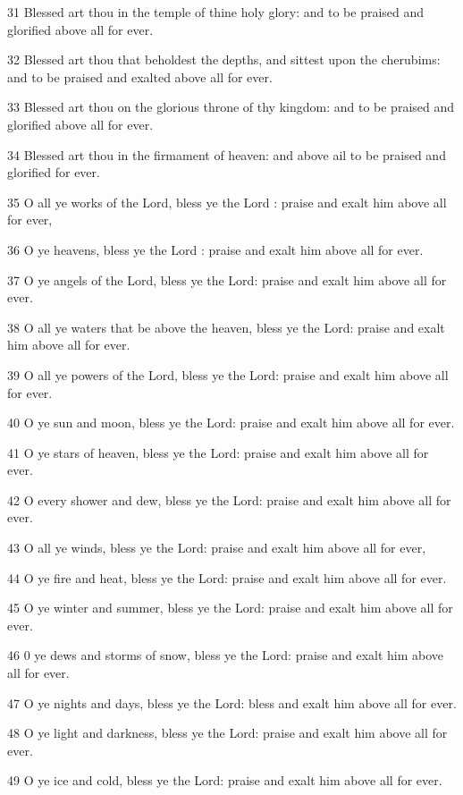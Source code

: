 \par 31 Blessed art thou in the temple of thine holy glory: and to be praised and glorified above all for ever.
\par 32 Blessed art thou that beholdest the depths, and sittest upon the cherubims: and to be praised and exalted above all for ever.
\par 33 Blessed art thou on the glorious throne of thy kingdom: and to be praised and glorified above all for ever.
\par 34 Blessed art thou in the firmament of heaven: and above ail to be praised and glorified for ever.
\par 35 O all ye works of the Lord, bless ye the Lord : praise and exalt him above all for ever,
\par 36 O ye heavens, bless ye the Lord : praise and exalt him above all for ever.
\par 37 O ye angels of the Lord, bless ye the Lord: praise and exalt him above all for ever.
\par 38 O all ye waters that be above the heaven, bless ye the Lord: praise and exalt him above all for ever.
\par 39 O all ye powers of the Lord, bless ye the Lord: praise and exalt him above all for ever.
\par 40 O ye sun and moon, bless ye the Lord: praise and exalt him above all for ever.
\par 41 O ye stars of heaven, bless ye the Lord: praise and exalt him above all for ever.
\par 42 O every shower and dew, bless ye the Lord: praise and exalt him above all for ever.
\par 43 O all ye winds, bless ye the Lord: praise and exalt him above all for ever,
\par 44 O ye fire and heat, bless ye the Lord: praise and exalt him above all for ever.
\par 45 O ye winter and summer, bless ye the Lord: praise and exalt him above all for ever.
\par 46 0 ye dews and storms of snow, bless ye the Lord: praise and exalt him above all for ever.
\par 47 O ye nights and days, bless ye the Lord: bless and exalt him above all for ever.
\par 48 O ye light and darkness, bless ye the Lord: praise and exalt him above all for ever.
\par 49 O ye ice and cold, bless ye the Lord: praise and exalt him above all for ever.
